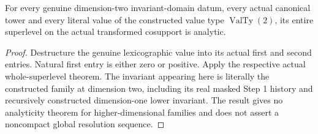 \begin{theorem}
\label{hir:general-two-all-canonical-superlevels}
\leanok
For every genuine dimension-two invariant-domain datum, every actual
canonical tower and every literal value of the constructed value type
$\operatorname{ValTy}(2)$, its entire superlevel on the actual transformed
cosupport is analytic.
\end{theorem}
\begin{proof}
Destructure the genuine lexicographic value into its actual first and
second entries. Natural first entry is either zero or positive. Apply the
respective actual whole-superlevel theorem. The invariant appearing here
is literally the constructed family at dimension two, including its real
masked Step 1 history and recursively constructed dimension-one lower
invariant. The result gives no analyticity theorem for higher-dimensional
families and does not assert a noncompact global resolution sequence.
\end{proof}
